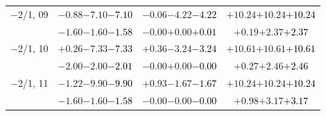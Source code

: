 \documentclass[compress]{beamer}
\begin{document}
\begin{frame}
\begin{tabular}{r | c | c | c}
$-$2/1, 09 & $-0.88$\hspace{0.1 cm}$-7.10$\hspace{0.1 cm}\textcolor{black}{$-7.10$} & $-0.06$\hspace{0.1 cm}$-4.22$\hspace{0.1 cm}\textcolor{black}{$-4.22$} & $+10.24$\hspace{0.1 cm}$+10.24$\hspace{0.1 cm}\textcolor{black}{$+10.24$} \\
           & $-1.60$\hspace{0.1 cm}$-1.60$\hspace{0.1 cm}\textcolor{black}{$-1.58$} & $-0.00$\hspace{0.1 cm}$+0.00$\hspace{0.1 cm}\textcolor{black}{$+0.01$} & $+0.19$\hspace{0.1 cm}$+2.37$\hspace{0.1 cm}\textcolor{black}{$+2.37$} \\
$-$2/1, 10 & $+0.26$\hspace{0.1 cm}$-7.33$\hspace{0.1 cm}\textcolor{black}{$-7.33$} & $+0.36$\hspace{0.1 cm}$-3.24$\hspace{0.1 cm}\textcolor{black}{$-3.24$} & $+10.61$\hspace{0.1 cm}$+10.61$\hspace{0.1 cm}\textcolor{black}{$+10.61$} \\
           & $-2.00$\hspace{0.1 cm}$-2.00$\hspace{0.1 cm}\textcolor{black}{$-2.01$} & $-0.00$\hspace{0.1 cm}$+0.00$\hspace{0.1 cm}\textcolor{black}{$-0.00$} & $+0.27$\hspace{0.1 cm}$+2.46$\hspace{0.1 cm}\textcolor{black}{$+2.46$} \\
$-$2/1, 11 & $-1.22$\hspace{0.1 cm}$-9.90$\hspace{0.1 cm}\textcolor{black}{$-9.90$} & $+0.93$\hspace{0.1 cm}$-1.67$\hspace{0.1 cm}\textcolor{black}{$-1.67$} & $+10.24$\hspace{0.1 cm}$+10.24$\hspace{0.1 cm}\textcolor{black}{$+10.24$} \\
           & $-1.60$\hspace{0.1 cm}$-1.60$\hspace{0.1 cm}\textcolor{black}{$-1.58$} & $-0.00$\hspace{0.1 cm}$-0.00$\hspace{0.1 cm}\textcolor{black}{$-0.00$} & $+0.98$\hspace{0.1 cm}$+3.17$\hspace{0.1 cm}\textcolor{black}{$+3.17$} \\

\end{tabular}
\end{frame}
\end{document}
